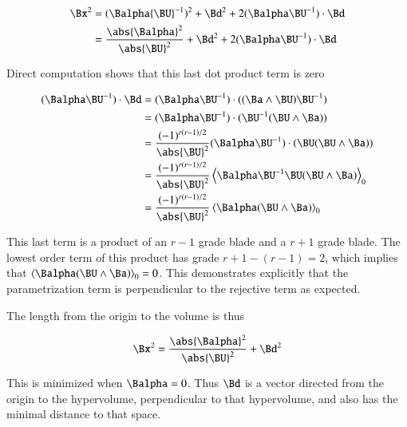 \begin{align*}
{\Bx}^2 
&= (\Balpha {\BU}^{-1})^2 + \Bd^2 + 2 (\Balpha \BU^{-1}) \cdot \Bd \\
&= \frac{\abs{\Balpha}^2}{{\abs{\BU}^2}} + \Bd^2 + 2 (\Balpha \BU^{-1}) \cdot \Bd
\end{align*}

Direct computation shows that this last dot product term is zero

\begin{align*}
(\Balpha \BU^{-1}) \cdot \Bd
&= (\Balpha \BU^{-1}) \cdot ((\Ba \wedge \BU){\BU}^{-1}) \\
&= (\Balpha \BU^{-1}) \cdot ( {\BU}^{-1} (\BU \wedge \Ba)) \\
&= \frac{(-1)^{r(r-1)/2}}{\abs{\BU}^2} (\Balpha \BU^{-1}) \cdot ( \BU (\BU \wedge \Ba)) \\
&= \frac{(-1)^{r(r-1)/2}}{\abs{\BU}^2} \left<\Balpha \BU^{-1} \BU (\BU \wedge \Ba)\right>_0 \\
&= \frac{(-1)^{r(r-1)/2}}{\abs{\BU}^2} \left<\Balpha (\BU \wedge \Ba)\right>_0 \\
\end{align*}

This last term is a product of an $r-1$ grade blade and a $r+1$ grade blade.  The lowest order term of this product has grade $r+1 -(r-1) = 2$, which
implies that
$\left<\Balpha (\BU \wedge \Ba)\right>_0 = 0$.  This demonstrates explicitly that the parametrization term is perpendicular to the rejective term as expected.

The length from the origin to the volume is thus

\begin{align*}
{\Bx}^2 &= \frac{\abs{\Balpha}^2}{{\abs{\BU}^2}} + \Bd^2 \\
\end{align*}

This is minimized when $\Balpha = 0$.  Thus $\Bd$ is a vector directed from the origin to the hypervolume, perpendicular to that hypervolume, and also has the minimal distance to that space.


